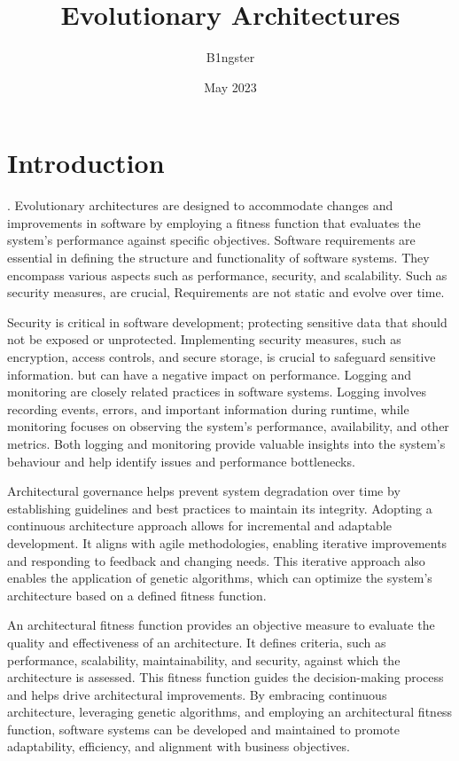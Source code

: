 \documentclass[main.tex]{subfiles}
\title{Evolutionary Architectures}
\author{B1ngster}
\date{May 2023}
\begin{document}
\maketitle

\section{Introduction}






. 
Evolutionary architectures are designed to accommodate changes and improvements in software by employing a fitness function that evaluates the system's performance against specific objectives. Software requirements are essential in defining the structure and functionality of software systems. They encompass various aspects such as performance, security, and scalability.  Such as security measures, are crucial,  Requirements are not static and evolve over time. 


Security is critical in software development; protecting sensitive data that should not be exposed or unprotected. Implementing  security measures, such as encryption, access controls, and secure storage, is crucial to safeguard sensitive information.  but can have a negative impact on performance.  Logging and monitoring are closely related practices in software systems. Logging involves recording events, errors, and important information during runtime, while monitoring focuses on observing the system's performance, availability, and other metrics. Both logging and monitoring provide valuable insights into the system's behaviour and help identify issues and performance bottlenecks.

Architectural governance helps prevent system degradation over time by establishing guidelines and best practices to maintain its integrity.
Adopting a continuous architecture approach allows for incremental and adaptable development. It aligns with agile methodologies, enabling iterative improvements and responding to feedback and changing needs. This iterative approach also enables the application of genetic algorithms, which can optimize the system's architecture based on a defined fitness function.

An architectural fitness function provides an objective measure to evaluate the quality and effectiveness of an architecture. It defines criteria, such as performance, scalability, maintainability, and security, against which the architecture is assessed. This fitness function guides the decision-making process and helps drive architectural improvements. By embracing continuous architecture, leveraging genetic algorithms, and employing an architectural fitness function, software systems can be developed and maintained to promote adaptability, efficiency, and alignment with business objectives.
\end{document}
